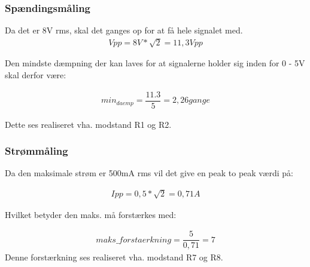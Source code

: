 \subsubsection{Spændingsmåling}
Da det er 8V rms, skal det ganges op for at få hele signalet med.
\begin{align}
Vpp = 8V*\sqrt{2} = 11,3Vpp
\end{align}

Den mindste dæmpning der kan laves for at signalerne holder sig inden for 0 - 5V skal derfor være:

\begin{align}
min_{daemp} = \dfrac{11.3}{5} = 2,26 gange
\end{align}

Dette ses realiseret vha. modstand R1 og R2.

\subsubsection{Strømmåling}

Da  den maksimale strøm er 500mA rms vil det give en peak to peak værdi på:

\begin{align}
Ipp = 0,5*\sqrt{2} = 0,71A
\end{align}

Hvilket betyder den maks. må forstærkes med:

\begin{align}
maks\_forstaerkning = \dfrac{5}{0,71} = 7
\end{align}
Denne forstærkning ses realiseret vha. modstand R7 og R8.  



 